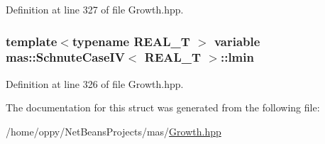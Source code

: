Definition at line 327 of file Growth.\-hpp.

\hypertarget{structmas_1_1_schnute_case_i_v_a7b4d5a4e32071d80cd213ca5191bd7b1}{
\subsubsection[{lmin}]{\setlength{\rightskip}{0pt plus 5cm}template$<$typename R\-E\-A\-L\-\_\-\-T $>$ {\bf variable} {\bf mas\-::\-Schnute\-Case\-I\-V}$<$ R\-E\-A\-L\-\_\-\-T $>$\-::lmin}}\label{structmas_1_1_schnute_case_i_v_a7b4d5a4e32071d80cd213ca5191bd7b1}


Definition at line 326 of file Growth.\-hpp.



The documentation for this struct was generated from the following file\-:\begin{DoxyCompactItemize}
\item 
/home/oppy/\-Net\-Beans\-Projects/mas/\hyperlink{_growth_8hpp}{Growth.\-hpp}\end{DoxyCompactItemize}
